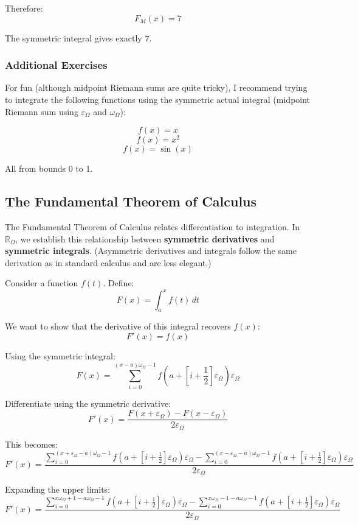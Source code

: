\documentclass{article}
\begin{document}
Therefore:
$$F_M(x) = 7$$

The symmetric integral gives exactly $\boxed{7}$.

\subsubsection{Additional Exercises}

For fun (although midpoint Riemann sums are quite tricky), I recommend trying to integrate the following functions using the symmetric actual integral (midpoint Riemann sum using $\varepsilon_\Omega$ and $\omega_\Omega$):

$$f(x)=x$$ $$f(x)=x^2$$ $$f(x)=\sin(x)$$

All from bounds 0 to 1.

\subsection{The Fundamental Theorem of Calculus}

The Fundamental Theorem of Calculus relates differentiation to integration. In $\mathbb{R}_\Omega$, we establish this relationship between \textbf{symmetric derivatives} and \textbf{symmetric integrals}. (Asymmetric derivatives and integrals follow the same derivation as in standard calculus and are less elegant.)

Consider a function $f(t)$. Define:
$$F(x) = \int_a^x f(t) \, dt$$

We want to show that the derivative of this integral recovers $f(x)$:
$$F'(x) = f(x)$$

Using the symmetric integral:
$$F(x) = \sum_{i=0}^{(x-a)\omega_\Omega - 1} f\left(a + \left[i + \frac{1}{2}\right]\varepsilon_\Omega\right) \varepsilon_\Omega$$

Differentiate using the symmetric derivative:
$$F'(x) = \frac{F(x + \varepsilon_\Omega) - F(x - \varepsilon_\Omega)}{2\varepsilon_\Omega}$$

This becomes:
$$F'(x) = \frac{\displaystyle \sum_{i=0}^{(x + \varepsilon_\Omega - a)\omega_\Omega - 1} f\left(a + \left[i + \frac{1}{2}\right]\varepsilon_\Omega\right)\varepsilon_\Omega - \sum_{i=0}^{(x - \varepsilon_\Omega - a)\omega_\Omega - 1} f\left(a + \left[i + \frac{1}{2}\right]\varepsilon_\Omega\right)\varepsilon_\Omega}{2\varepsilon_\Omega}$$

Expanding the upper limits:
$$F'(x) = \frac{\displaystyle \sum_{i=0}^{x\omega_\Omega + 1 - a\omega_\Omega - 1} f\left(a + \left[i + \frac{1}{2}\right]\varepsilon_\Omega\right)\varepsilon_\Omega - \sum_{i=0}^{x\omega_\Omega - 1 - a\omega_\Omega - 1} f\left(a + \left[i + \frac{1}{2}\right]\varepsilon_\Omega\right)\varepsilon_\Omega}{2\varepsilon_\Omega}$$
\end{document}
